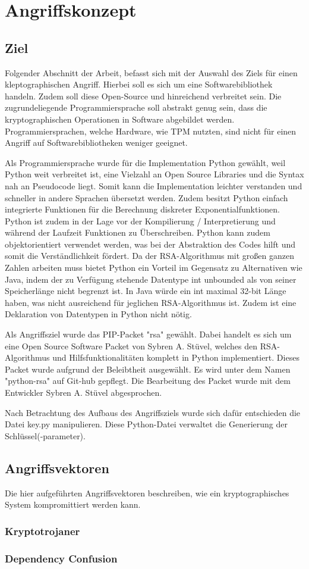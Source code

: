 \chapter{Angriffskonzept}

    \section{Ziel}
        Folgender Abschnitt der Arbeit, befasst sich mit der Auswahl des Ziels für einen kleptographischen Angriff. Hierbei soll es sich um eine Softwarebibliothek handeln. Zudem soll diese Open-Source und hinreichend verbreitet sein. Die zugrundeliegende Programmiersprache soll abstrakt genug sein, dass die kryptographischen Operationen in Software abgebildet werden. Programmiersprachen, welche Hardware, wie \ac{TPM} nutzten, sind nicht für einen Angriff auf Softwarebibliotheken weniger geeignet.

        Als Programmiersprache wurde für die Implementation Python gewählt, weil Python weit verbreitet ist, eine Vielzahl an Open Source Libraries und die Syntax nah an Pseudocode liegt. Somit kann die Implementation leichter verstanden und schneller in andere Sprachen übersetzt werden. Zudem besitzt Python einfach integrierte Funktionen für die Berechnung diskreter Exponentialfunktionen. Python ist zudem in der Lage vor der Kompilierung / Interpretierung und während der Laufzeit Funktionen zu Überschreiben. Python kann zudem objektorientiert verwendet werden, was bei der Abstraktion des Codes hilft und somit die Verständlichkeit fördert. Da der \ac{RSA}-Algorithmus mit großen ganzen Zahlen arbeiten muss bietet Python ein Vorteil im Gegensatz zu Alternativen wie Java, indem der zu Verfügung stehende Datentype int unbounded als von seiner Speicherlänge nicht begrenzt ist. In Java würde ein int maximal 32-bit Länge haben, was nicht ausreichend für jeglichen \ac{RSA}-Algorithmus ist. Zudem ist eine Deklaration von Datentypen in Python nicht nötig. 

        Als Angriffsziel wurde das PIP-Packet "rsa" gewählt. Dabei handelt es sich um eine Open Source Software Packet von Sybren A. Stüvel, welches den \ac{RSA}-Algorithmus und Hilfsfunktionalitäten komplett in Python implementiert. Dieses Packet wurde aufgrund der Beleibtheit ausgewählt. Es wird unter dem Namen "python-rsa" auf Git-hub gepflegt. Die Bearbeitung des Packet wurde mit dem Entwickler Sybren A. Stüvel abgesprochen.

        Nach Betrachtung des Aufbaus des Angriffsziels wurde sich dafür entschieden die Datei key.py manipulieren. Diese Python-Datei verwaltet die Generierung der Schlüssel(-parameter).
    
    \section{Angriffsvektoren}
        Die hier aufgeführten Angriffsvektoren beschreiben, wie ein kryptographisches System kompromittiert werden kann.

        \subsection{Kryptotrojaner}

        \subsection{Dependency Confusion}